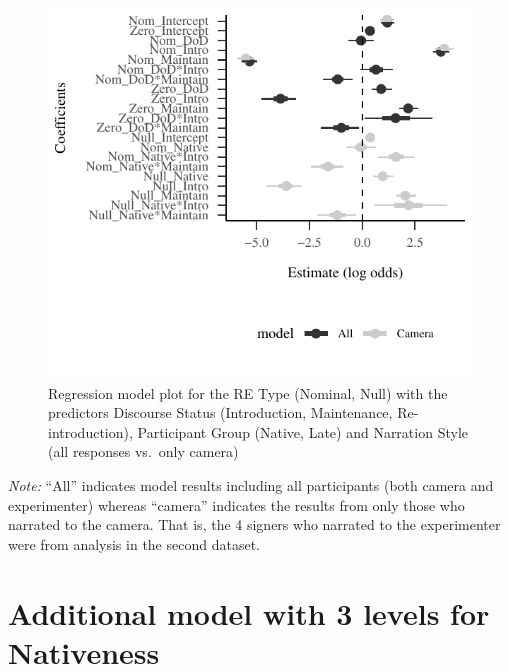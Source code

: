 \documentclass[]{elsarticle} %
\begin{document}
\begin{figure}
\centering
\includegraphics{revised_manuscript_files/figure-latex/model-camera-1.pdf}
\caption{Regression model plot for the RE Type (Nominal, Null) with the
predictors Discourse Status (Introduction, Maintenance,
Re-introduction), Participant Group (Native, Late) and Narration Style
(all responses vs.~only camera)}
\end{figure}

\emph{Note:} ``All'' indicates model results including all participants
(both camera and experimenter) whereas ``camera'' indicates the results
from only those who narrated to the camera. That is, the 4 signers who
narrated to the experimenter were from analysis in the second dataset.

\clearpage

\hypertarget{additional-model-with-3-levels-for-nativeness}{%
\section{Additional model with 3 levels for
Nativeness}\label{additional-model-with-3-levels-for-nativeness}}

\label{section:d}
\end{document}
